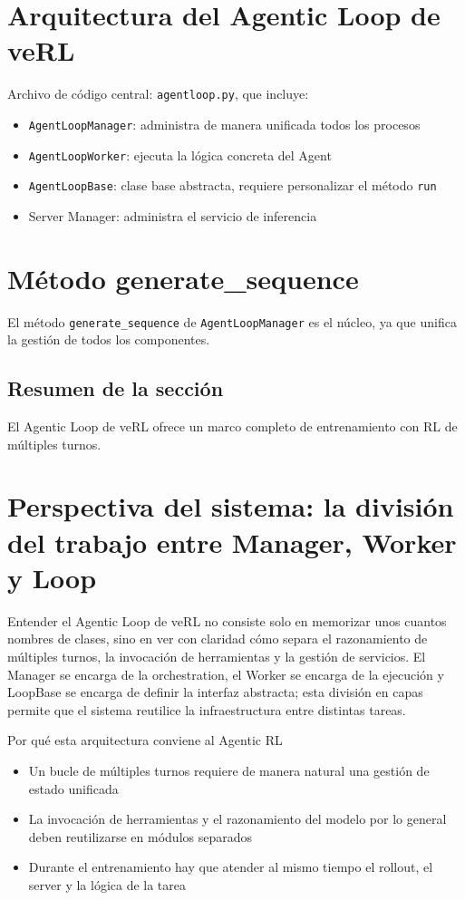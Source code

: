 \documentclass[a4paper]{article}
\begin{document}
\section{Arquitectura del Agentic Loop de veRL}
Archivo de código central: \texttt{agentloop.py}, que incluye:
\begin{itemize}
  \item \texttt{AgentLoopManager}: administra de manera unificada todos los procesos
  \item \texttt{AgentLoopWorker}: ejecuta la lógica concreta del Agent
  \item \texttt{AgentLoopBase}: clase base abstracta, requiere personalizar el método \texttt{run}
  \item Server Manager: administra el servicio de inferencia
\end{itemize}

\section{Método generate\_sequence}
El método \texttt{generate\_sequence} de \texttt{AgentLoopManager} es el núcleo, ya que unifica la gestión de todos los componentes.

\subsection{Resumen de la sección}
El Agentic Loop de veRL ofrece un marco completo de entrenamiento con RL de múltiples turnos.

\section{Perspectiva del sistema: la división del trabajo entre Manager, Worker y Loop}
Entender el Agentic Loop de veRL no consiste solo en memorizar unos cuantos nombres de clases, sino en ver con claridad cómo separa el razonamiento de múltiples turnos, la invocación de herramientas y la gestión de servicios. El Manager se encarga de la orchestration, el Worker se encarga de la ejecución y LoopBase se encarga de definir la interfaz abstracta; esta división en capas permite que el sistema reutilice la infraestructura entre distintas tareas.

\begin{knowledgebox}{Por qué esta arquitectura conviene al Agentic RL}
\begin{itemize}
  \item Un bucle de múltiples turnos requiere de manera natural una gestión de estado unificada
  \item La invocación de herramientas y el razonamiento del modelo por lo general deben reutilizarse en módulos separados
  \item Durante el entrenamiento hay que atender al mismo tiempo el rollout, el server y la lógica de la tarea
\end{itemize}
\end{knowledgebox}
\end{document}
